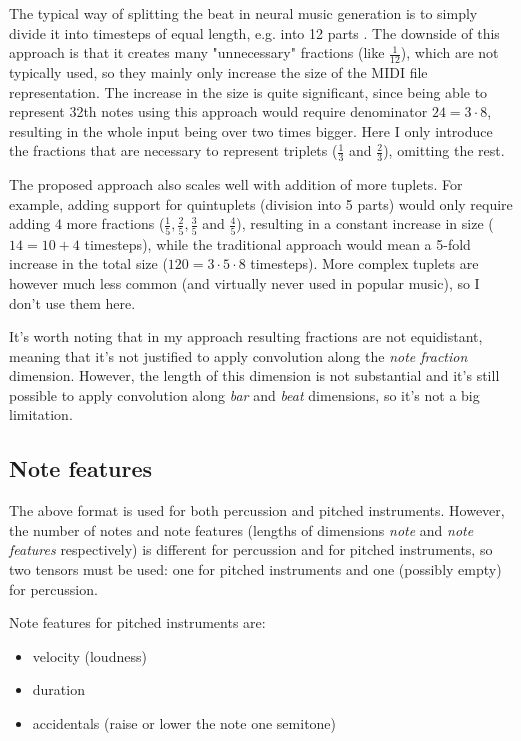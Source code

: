 \documentclass[en]{pracamgr}
\begin{document}
The typical way of splitting the beat in neural music generation is to simply divide it into timesteps of equal length, e.g. into 12 parts \cite{clara}.
The downside of this approach is that it creates many "unnecessary" fractions (like $\frac{1}{12}$), which are not typically used, so they mainly only increase the size of the MIDI file representation.
The increase in the size is quite significant, since being able to represent 32th notes using this approach would require denominator $24=3\cdot8$, resulting in the whole input being over two times bigger.
Here I only introduce the fractions that are necessary to represent triplets ($\frac{1}{3}$ and $\frac{2}{3}$), omitting the rest.

The proposed approach also scales well with addition of more tuplets.
For example, adding support for quintuplets (division into 5 parts) would only require adding 4 more fractions ($\frac{1}{5}, \frac{2}{5}, \frac{3}{5}$ and $\frac{4}{5}$), resulting in a constant increase in size ($14=10 + 4$ timesteps), while the traditional approach would mean a 5-fold increase in the total size ($120=3\cdot5\cdot8$ timesteps). More complex tuplets are however much less common (and virtually never used in popular music), so I don't use them here.

It's worth noting that in my approach resulting fractions are not equidistant, meaning that it's not justified to apply convolution along the \emph{note fraction} dimension.
However, the length of this dimension is not substantial and it's still possible to apply convolution along \emph{bar} and \emph{beat} dimensions, so it's not a big limitation.

\subsection{Note features}

The above format is used for both percussion and pitched instruments.
However, the number of notes and note features (lengths of dimensions \emph{note} and \emph{note features} respectively) is different for percussion and for pitched instruments, so two tensors must be used: one for pitched instruments and one (possibly empty) for percussion.

Note features for pitched instruments are:
\begin{itemize}
    \item velocity (loudness)
    \item duration
    \item accidentals (raise or lower the note one semitone)
\end{itemize}
\end{document}
